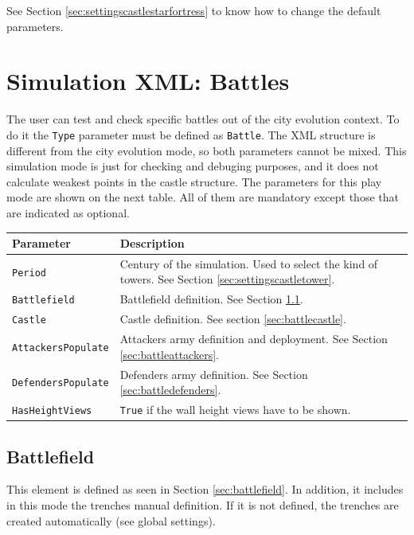 \documentclass[tog]{acmsiggraph}
\begin{document}
See Section \ref{sec:settingscastlestarfortress} to know how to change the default parameters.



\section{Simulation XML: Battles}
\label{sec:battle}

The user can test and check specific battles out of the city evolution context. To do it the \texttt{Type} parameter must be defined as \texttt{Battle}.
The XML structure is different from the city evolution mode, so both parameters cannot be mixed.
This simulation mode is just for checking and debuging purposes, and it does not calculate weakest points in the castle structure.
The parameters for this play mode are shown on the next table. All of them are mandatory except those that are indicated as optional.

\begin{tabularx}{0.48\textwidth}{ |l|X| }
\hline 
\textbf{Parameter} & \textbf{Description} \\[0.15cm]
 \hline
 \texttt{Period} & Century of the simulation. Used to select the kind of towers. See Section \ref{sec:settingscastletower}.\\
 \hline
 \texttt{Battlefield} & Battlefield definition. See Section \ref{sec:battlebattlefield}. \\
 \hline
 \texttt{Castle} & Castle definition. See section \ref{sec:battlecastle}. \\
 \hline
 \texttt{AttackersPopulate} & Attackers army definition and deployment. See Section \ref{sec:battleattackers}. \\
 \hline
 \texttt{DefendersPopulate} & Defenders army definition. See Section \ref{sec:battledefenders}. \\
 \hline
 \texttt{HasHeightViews} & \texttt{True} if the wall height views have to be shown. \\
 \hline
\end{tabularx} 



\subsection{Battlefield}
\label{sec:battlebattlefield}

This element is defined as seen in Section \ref{sec:battlefield}.
In addition, it includes in this mode the trenches manual definition.
If it is not defined, the trenches are created automatically (see global settings).
\end{document}
